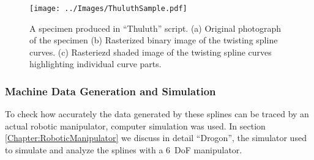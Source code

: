 \begin{figure}
  \centering
  \texttt{[image: ../Images/ThuluthSample.pdf]}
  \caption{A specimen produced in ``Thuluth'' script. (a) Original photograph of the specimen (b) Rasterized binary image of the twisting spline curves. (c) Rasteriezd shaded image of the twisting spline curves highlighting individual curve parts.
  }
  \label{Fig:Thuluth}
\end{figure}

\subsubsection{Machine Data Generation and Simulation}
To check how accurately the data generated by these splines can be traced by an actual robotic manipulator, computer simulation was used. In section \ref{Chapter:RoboticManipulator} we discuss in detail ``Drogon'', the simulator used to simulate and analyze the splines with a $6$~DoF manipulator.

\clearpage        